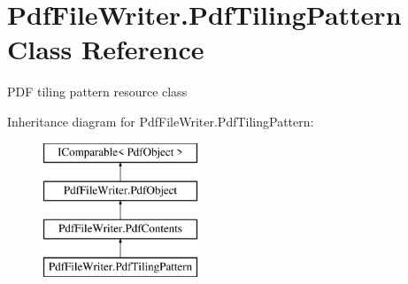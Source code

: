 \hypertarget{class_pdf_file_writer_1_1_pdf_tiling_pattern}{}\section{Pdf\+File\+Writer.\+Pdf\+Tiling\+Pattern Class Reference}
\label{class_pdf_file_writer_1_1_pdf_tiling_pattern}


P\+DF tiling pattern resource class  


Inheritance diagram for Pdf\+File\+Writer.\+Pdf\+Tiling\+Pattern\+:\begin{figure}[H]
\begin{center}
\leavevmode
\includegraphics[height=4.000000cm]{class_pdf_file_writer_1_1_pdf_tiling_pattern}
\end{center}
\end{figure}
